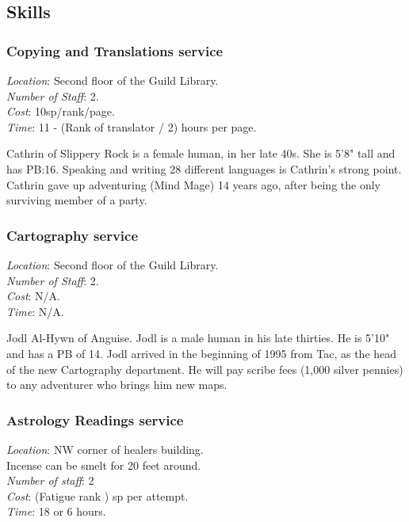 \documentclass[twoside,a4paper]{article}
\begin{document}
\begin{multicols}{2}
\subsection{Skills}

\subsubsection{Copying and Translations service}

\begin{flushleft}
\emph{Location}: Second floor of the Guild Library. \\
\emph{Number of Staff}: 2. \\
\emph{Cost}: 10sp/rank/page. \\
\emph{Time}: 11 - (Rank of translator / 2) hours per page. \\
\end{flushleft}

Cathrin of Slippery Rock is a female human, in her late 40s. She is
5'8" tall and has PB:16. Speaking and writing 28 different languages
is Cathrin's strong point. Cathrin gave up adventuring (Mind Mage) 14
years ago, after being the only surviving member of a party.

\subsubsection{Cartography service}

\begin{flushleft}
\emph{Location}: Second floor of the Guild Library. \\
\emph{Number of Staff}: 2. \\
\emph{Cost}: N/A. \\
\emph{Time}: N/A. \\
\end{flushleft}

Jodl Al-Hywn of Anguise. Jodl is a male human in his late thirties. He
is 5'10" and has a PB of 14. Jodl arrived in the beginning of 1995
from Tac, as the head of the new Cartography department. He will pay
scribe fees (1,000 silver pennies) to any adventurer who brings him
new maps.

\subsubsection{Astrology Readings service}

\begin{flushleft}
\emph{Location}: NW corner of healers building. \\
     Incense can be smelt for 20 feet around. \\
\emph{Number of staff}: 2 \\
\emph{Cost}: (Fatigue \x rank ) sp per attempt. \\
\emph{Time}: 18 or 6 hours. \\
\end{flushleft}


\end{multicols}
\end{document}
